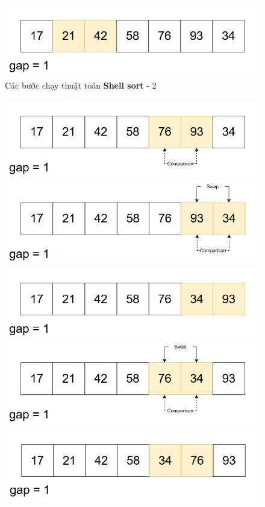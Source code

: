 \begin{figure}[H]
    \includegraphics[width=0.5\linewidth]{img/shell_sort/16.png}
    \caption{Các bước chạy thuật toán \textbf{Shell sort} - 2}
\end{figure}


\begin{figure}[H]
    \centering
    \includegraphics[width=0.5\linewidth]{img/shell_sort/17.png}
    \vspace{0.15cm}

    \includegraphics[width=0.5\linewidth]{img/shell_sort/18.png}
    \vspace{0.15cm}

    \includegraphics[width=0.5\linewidth]{img/shell_sort/19.png}
    \vspace{0.15cm}

    \includegraphics[width=0.5\linewidth]{img/shell_sort/20.png}
    \vspace{0.15cm}

    \includegraphics[width=0.5\linewidth]{img/shell_sort/21.png}
    \vspace{0.15cm}


\end{figure}

